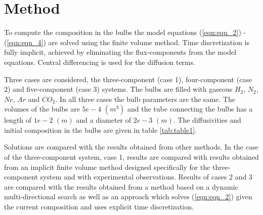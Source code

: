 \documentclass[11]{Report}
\begin{document}
\section*{Method}
To compute the composition in the bulbs the model equations (\ref{eqn:eqn_2}) - (\ref{eqn:eqn_4}) are solved using the finite volume method. Time discretization is fully implicit, achieved by eliminating the flux-components from the model equations. Central differencing is used for the diffusion terms.

Three cases are considered, the three-component (case 1), four-component (case 2) and five-component (case 3) systems. The bulbs are filled with gaseous $H_2$, $N_2$, $Ne$, $Ar$ and $CO_2$. In all three cases the bulb parameters are the same. The volumes of the bulbs are $5e-4$ $(m^3)$ and the tube connecting the bulbs has a length of $1e-2$ $(m)$ and a diameter of $2e-3$ $(m)$. The diffusivities and initial composition in the bulbs are given in table \ref{tab:table1}.

Solutions are compared with the results obtained from other methods. In the case of the three-component system, case 1, results are compared with results obtained from an implicit finite volume method designed specifically for the three-component system and with experimental observations. Results of cases 2 and 3 are compared with the results obtained from a method based on a dynamic multi-directional search as well as an approach which solves (\ref{eqn:eqn_2}) given the current composition and uses explicit time discretization. 
\end{document}
